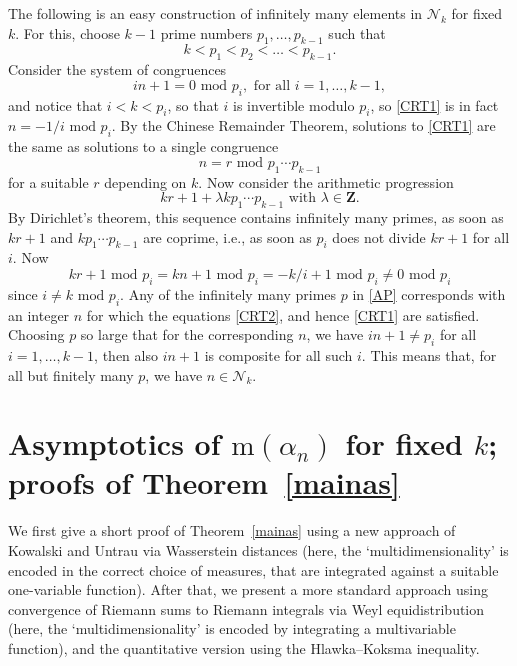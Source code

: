 \documentclass[12pt,reqno]{amsart}
\theoremstyle{definition}
\theoremstyle{plain}
\theoremstyle{definition}
\newcommand{\Z}{\mathbf{Z}}
\newcommand\m{\mathrm{m}}
\newcommand\NN{{\mathcal N}}
\begin{document}
The following is an easy construction of infinitely many elements in $\NN_k$ for fixed $k$. For this, choose $k-1$ prime numbers $p_1,\dots,p_{k-1}$ such that 
$$ k < p_1 < p_2 < \dots < p_{k-1}.$$ Consider the system of congruences  
\begin{equation} \label{CRT1} in+1 = 0 \mbox{ mod } p_i, \mbox{ for all } i=1,\dots,k-1, \end{equation} 
and notice that $i<k<p_i$, so that $i$ is invertible modulo $p_i$, so \eqref{CRT1} is in fact $n = -1/i \mbox{ mod } p_i$. 
By the Chinese Remainder Theorem, solutions to \eqref{CRT1} are the same as solutions to a single congruence 
\begin{equation} \label{CRT2} n= r \mbox{ mod } p_1\cdots p_{k-1}\end{equation} 
for a suitable $r$ depending on $k$. 
Now consider the arithmetic progression 
\begin{equation} \label{AP} kr+1 + \lambda kp_1\cdots p_{k-1} \mbox{ with } \lambda \in \Z. \end{equation} 
By Dirichlet's theorem, this sequence contains infinitely many primes, as soon as $kr+1$ and $kp_1\cdots p_{k-1}$ are coprime, i.e., as soon as $p_i$ does not divide $kr+1$ for all $i$. Now $$kr+1 \mbox{ mod } p_i = kn+1 \mbox{ mod } p_i = -k/i+1 \mbox{ mod } p_i \neq 0 \mbox{ mod } p_i$$ since $i \neq k \mbox{ mod } p_i$. 
Any of the infinitely many primes $p$ in \eqref{AP} corresponds with an integer $n$ for which the equations \eqref{CRT2}, and hence \eqref{CRT1} are satisfied. Choosing $p$ so large that  for the corresponding $n$, we have $in+1 \neq p_i$ for all $i=1,\dots,k-1$, then also $in+1$ is composite for all such $i$. This means that, for all but finitely many $p$, we have $n \in \NN_k$. 

 
\section{Asymptotics of $\m(\alpha_n)$ for fixed $k$; proofs of Theorem~\ref{mainas}} \label{proof1} 
\label{sec:asymp_m_alpha_n_fixed_k}



We first give a short proof of Theorem~\ref{mainas} using a new approach of Kowalski and Untrau via Wasserstein distances (here, the `multidimensionality' is encoded in the correct choice of measures, that are integrated against a suitable one-variable function). After that, we present a more standard approach using convergence of Riemann sums to Riemann integrals via Weyl equidistribution (here, the `multidimensionality' is encoded by integrating a multivariable function), and the quantitative version using the Hlawka--Koksma inequality. 
\end{document}

